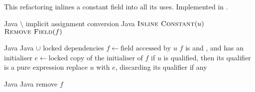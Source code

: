 \subsection{}
This refactoring inlines a constant field into all its uses. Implemented in .

\begin{algorithm}
\caption{$\refactoring{Inline Constant}(f : \type{Field})$}
\begin{algorithmic}[1]
\REQUIRE Java $\setminus$ implicit assignment conversion
\ENSURE Java
\medskip
{}
  \STATE $\textsc{Inline Constant}(u)$
\ENDFOR
\STATE $\textsc{Remove Field}(f)$
\end{algorithmic}
\end{algorithm}

\begin{algorithm}
\caption{$\refactoring{Inline Constant}(u : \type{FieldAccess})$}
\begin{algorithmic}[1]
\REQUIRE Java
\ENSURE Java $\cup$ locked dependencies
\medskip
\STATE $f \leftarrow \text{field accessed by $u$}$
\STATE \assert $f$ is  and , and has an initialiser
\STATE $e \leftarrow \text{locked copy of the initialiser of $f$}$
\STATE \assert if $u$ is qualified, then its qualifier is a pure expression
\STATE replace $u$ with $e$, discarding its qualifier if any
\end{algorithmic}
\end{algorithm}

\begin{algorithm}
\caption{$\refactoring{Remove Field}(f : \type{Field})$}
\begin{algorithmic}[1]
\REQUIRE Java
\ENSURE Java
\medskip
{}
  \STATE remove $f$
\ENDIF
\end{algorithmic}
\end{algorithm}
